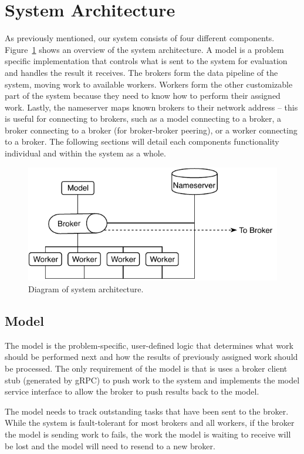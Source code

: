 \documentclass[conference]{IEEEtran}
\begin{document}
\section{System Architecture}
As previously mentioned, our system consists of four different components.
Figure~\ref{fig:sys-arch} shows an overview of the system architecture.  A model
is a problem specific implementation that controls what is sent to the system
for evaluation and handles the result it receives. The brokers form the data
pipeline of the system, moving work to available workers. Workers form the other
customizable part of the system because they need to know how to perform their
assigned work.  Lastly, the nameserver maps known brokers to their network
address -- this is useful for connecting to brokers, such as a model connecting
to a broker, a broker connecting to a broker (for broker-broker peering), or a
worker connecting to a broker. The following sections will detail each
components functionality individual and within the system as a whole.

\begin{figure}
  \centering
  \includegraphics[width=.85\columnwidth]{img/system-arch.pdf}
  \caption{Diagram of system architecture.}
  \label{fig:sys-arch}
\end{figure}

\subsection{Model}
The model is the problem-specific, user-defined logic that determines what work
should be performed next and how the results of previously assigned work should
be processed. The only requirement of the model is that is uses a broker client
stub (generated by gRPC) to push work to the system and implements the model
service interface to allow the broker to push results back to the model.

The model needs to track outstanding tasks that have been sent to the broker.
While the system is fault-tolerant for most brokers and all workers, if the
broker the model is sending work to fails, the work the model is waiting to
receive will be lost and the model will need to resend to a new broker.
\end{document}
